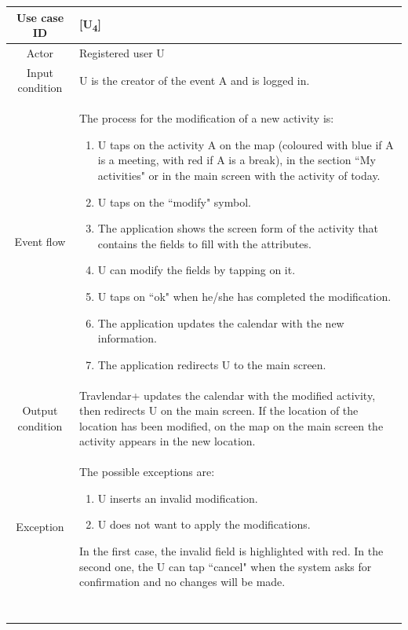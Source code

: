 \documentclass[12pt,titlepage]{article}
\begin{document}
\begin{tabular}{cp{10cm}} 
Use case ID& {[U\textsubscript{4}]}\\ \hline
Actor&Registered user U \\ \hline 
Input condition&U is the creator of the event A and is logged in.\\ \hline
Event flow&The process for the modification of a new activity is: \begin{enumerate}
\item U taps on the activity A on the map (coloured with blue if A is a meeting, with red if A is a break), in the section ``My activities" or in the main screen with the activity of today.
\item U taps on the ``modify" symbol.
\item The application shows the screen form of the activity that contains the fields to fill with the attributes.
\item U can modify the fields by tapping on it.
\item U taps on ``ok" when he/she has completed the modification.
\item The application updates the calendar with the new information.
\item The application redirects U to the main screen. 
\end{enumerate} \\ \hline
Output condition& Travlendar+ updates the calendar with the modified activity, then redirects U on the main screen. If the location of the location has been modified, on the map on the main screen the activity appears in the new location.
\\ \hline
Exception& The possible exceptions are:
\begin{enumerate}
\item U inserts an invalid modification.
\item U does not want to apply the modifications.
\end{enumerate} 
In the first case, the invalid field is highlighted with red. In the second one, the U can tap ``cancel" when the system asks for confirmation and no changes will be made.
\\ \hline \

\end{tabular}
\end{document}
